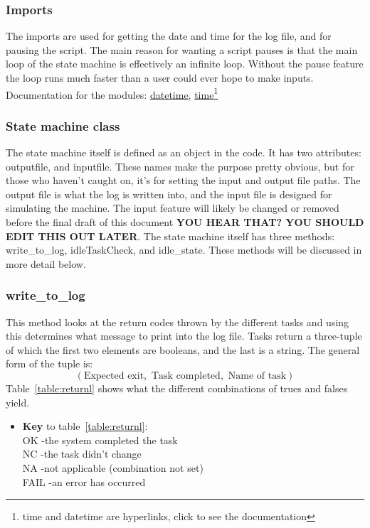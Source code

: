 \documentclass{article}
\begin{document}
\subsubsection{Imports}
\label{section:imports_sm}
The imports are used for getting the date and time for the log file, and for pausing the script. The main reason for wanting a script pauses is that the main loop of the state machine is effectively an infinite loop. Without the pause feature the loop runs much faster than a user could ever hope to make inputs. Documentation for the modules: \href{https://docs.python.org/3/library/datetime.html}{datetime}, 
\href{https://docs.python.org/3/library/time.html}{time}\footnote{time and datetime are hyperlinks, click to see the documentation}\\

\subsubsection{State machine class}
The state machine itself is defined as an object in the code. It has two attributes: outputfile, and inputfile. These names make the purpose pretty obvious, but for those who haven't caught on, it's for setting the input and output file paths. The output file is what the log is written into, and the input file is designed for simulating the machine. The input feature will likely be changed or removed before the final draft of this document \textbf{YOU HEAR THAT? YOU SHOULD EDIT THIS OUT LATER}. The state machine itself has three methods: write\_to\_log, idleTaskCheck, and idle\_state. These methods will be discussed in more detail below.

\subsubsection{write\_to\_log}
\label{section:logwrite}
This method looks at the return codes thrown by the different tasks and using this determines what message to print into the log file. Tasks return a three-tuple of which the first two elements are booleans, and the last is a string. The general form of the tuple is:\\
$$\left(\text{Expected exit}, \text{ Task completed},\text{ Name of task}\right)$$
Table~\ref{table:returnl} shows what the different combinations of trues and falses yield. 

\begin{itemize}
    \item \textbf{Key} to table~\ref{table:returnl}:\\
    OK -the system completed the task\\
    NC -the task didn't change\\
    NA -not applicable (combination not set)\\
    FAIL -an error has occurred\\
\end{itemize}
\end{document}
